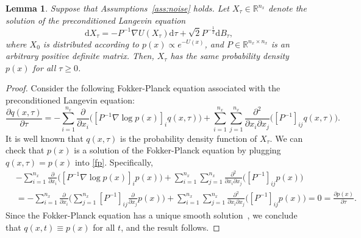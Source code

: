 \documentclass[11pt]{article}
\theoremstyle{plain}
\newtheorem{lem}[thm]{Lemma}
\theoremstyle{definition}
\theoremstyle{remark}
\begin{document}
\begin{lem}\label{lem:ld}
Suppose that Assumptions~\ref{ass:noise} holds.
Let $X_{\tau} \in \mathbb{R}^{n_x}$ denote the solution of the preconditioned Langevin equation
\[
\mathrm{d} X_{\tau} = -P^{-1} \nabla U( X_{\tau}) \mathrm{d} {\tau} + \sqrt{2} P^{-\frac{1}{2}} \mathrm{d} B_{\tau},
\]
where $X_0$ is distributed according to $p(x) \propto e^{-U(x)}$, and 
 $P \in \mathbb{R}^{n_x \times n_x}$ is an arbitrary  positive definite matrix. 
Then, $X_{\tau}$ has the same probability density $p(x)$ for all ${\tau} \geq 0$. 
\end{lem}

\begin{proof}
Consider the following Fokker-Planck equation associated with the preconditioned Langevin equation:
\begin{equation}\label{fp}
\frac{\partial q (x, {\tau})}{\partial {\tau}} = -\sum_{i=1}^{n_x} \frac{\partial}{\partial x_i} \big ( 
[P^{-1} \nabla \log p (x) ]_i q (x, {\tau})
\big )
+ \sum_{i=1}^{n_x} \sum_{j=1}^{n_x} \frac{\partial^2}{\partial x_i \partial x_j} \big ( [P^{-1}]_{ij} q(x, {\tau})\big ).
\end{equation}
It is well known that $q(x,{\tau})$ is the probability density function of $X_{\tau}$. 
We can check that $p(x)$ is a solution of the Fokker-Planck equation by plugging $q(x, {\tau}) = p(x)$ into \eqref{fp}.
Specifically, 
\begin{equation}
\begin{split}
&-\sum_{i=1}^{n_x} \frac{\partial}{\partial x_i} \big ( 
[P^{-1} \nabla \log p (x) ]_i p(x) \big ) +  \sum_{i=1}^{n_x} \sum_{j=1}^{n_x} \frac{\partial^2}{\partial x_i \partial x_j} \big ( [P^{-1}]_{ij} p(x) \big )\\ &= 
-\sum_{i=1}^{n_x} \frac{\partial}{\partial x_i} \bigg ( \sum_{j=1}^{n_x}
[P^{-1}]_{ij} \frac{\partial}{\partial x_j} p (x)   \bigg) +  \sum_{i=1}^{n_x} \sum_{j=1}^{n_x} \frac{\partial^2}{\partial x_i \partial x_j} \big ( [P^{-1}]_{ij} p(x) \big ) = 
0 = \frac{\partial p(x)}{\partial {\tau}}.
\end{split}
\end{equation}
Since the Fokker-Planck equation has a unique smooth solution~\cite{pavliotis2014stochastic}, we conclude that $q(x, t) \equiv p(x)$ for all $t$, and the result follows. 
\end{proof}
\end{document}
